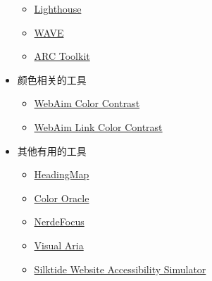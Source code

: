 \begin{paracol}{2}
\begin{itemize}
\begin{itemize}
  \item
    \href{https://chrome.google.com/webstore/detail/lighthouse/blipmdconlkpinefehnmjammfjpmpbjk}{Lighthouse}
  \item
    \href{https://chrome.google.com/webstore/detail/wave-evaluation-tool/jbbplnpkjmmeebjpijfedlgcdilocofh}{WAVE}
  \item
    \href{https://chrome.google.com/webstore/detail/arc-toolkit/chdkkkccnlfncngelccgbgfmjebmkmce?hl=en-US}{ARC
    Toolkit}
  \end{itemize}
\item
  颜色相关的工具
  \begin{itemize}
  \item
    \href{https://webaim.org/resources/contrastchecker/}{WebAim Color
    Contrast}
  \item
    \href{https://webaim.org/resources/linkcontrastchecker}{WebAim Link
    Color Contrast}
  \end{itemize}
\item
  其他有用的工具
  \begin{itemize}
  \item
    \href{https://chrome.google.com/webstore/detail/headingsmap/flbjommegcjonpdmenkdiocclhjacmbi?hl=en…}{HeadingMap}
  \item
    \href{https://colororacle.org/}{Color Oracle}
  \item
    \href{https://chrome.google.com/webstore/detail/nerdefocus/lpfiljldhgjecfepfljnbjnbjfhennpd?hl=en-US…}{NerdeFocus}
  \item
    \href{https://chrome.google.com/webstore/detail/visual-aria/lhbmajchkkmakajkjenkchhnhbadmhmk?hl=en-US}{Visual
    Aria}
  \item
    \href{https://chrome.google.com/webstore/detail/silktide-website-accessib/okcpiimdfkpkjcbihbmhppldhiebhhaf?hl=en-US}{Silktide
    Website Accessibility Simulator}
  \end{itemize}
\end{itemize}
\end{paracol}



